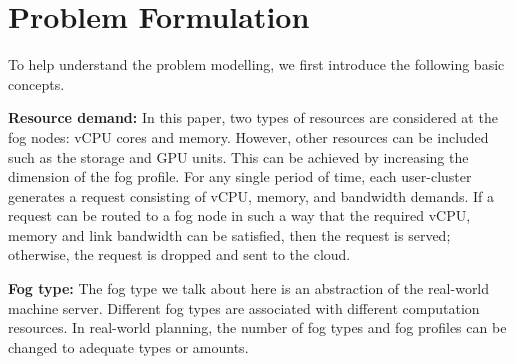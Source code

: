\documentclass[10pt,journal,compsoc]{IEEEtran}
\begin{document}
\section{Problem Formulation}\label{probfor}
To help understand the problem modelling, we first introduce the following basic concepts.



\textbf{Resource demand: }In this paper, two types of resources are considered at the fog nodes: vCPU cores and memory. 
However, other resources can be included such as the storage and GPU units. This can be achieved by increasing the dimension of the fog profile. For any single period of time, each user-cluster generates a request consisting of vCPU, memory, and bandwidth demands. If a request can be routed to a fog node in such a way that the required vCPU, memory and link bandwidth can be satisfied, then the request is served; otherwise, the request is dropped and sent to the cloud. 

\textbf{Fog type: }The fog type we talk about here is an abstraction of the real-world machine server. Different fog types are associated with different computation resources. In real-world planning, the number of fog types and fog profiles can be changed to adequate types or amounts.
\end{document}
